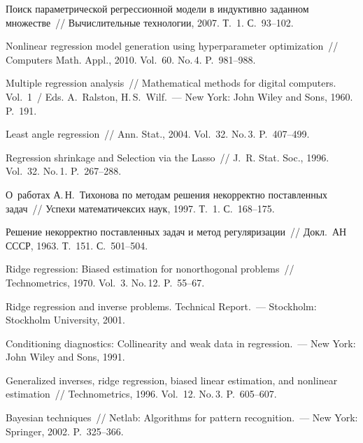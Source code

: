 \begin{multicols}{2}
{\small\frenchspacing
{%
\begin{thebibliography}{99}


 Поиск параметрической регрессионной модели в индуктивно заданном
множестве~// Вычислительные технологии, 2007. Т.~1. С.~93--102.

 Nonlinear regression model generation using 
hyperparameter optimization~// Computers Math. Appl., 2010. Vol.~60. No.\,4. P.~981--988.

 Multiple regression analysis~// 
Mathematical methods for digital computers. Vol.~1~/ Eds. A.~Ralston, H.\,S.~Wilf.~--- 
New York: John Wiley and Sons, 1960. P.~191.

Least angle regression~// Ann. Stat., 2004. Vol.~32. No.\,3. P.~407--499.

 Regression shrinkage and Selection via the Lasso~//
J.~R. Stat. Soc., 1996. Vol.~32. No.\,1.  P.~267--288.

 О~работах А.\,Н.~Тихонова по методам решения некорректно поставленных задач~//
Успехи математичексих наук, 1997. Т.~1. С.~168--175.

 Решение некорректно поставленных задач и метод регуляризации~//
Докл.\ АН СССР, 1963. Т.~151. С.~501--504.

 Ridge regression: Biased estimation for nonorthogonal problems~//
Technometrics, 1970. Vol.~3. No.\,12. P.~55--67.

 Ridge regression and inverse problems. Technical Report.~--- Stockholm: 
Stockholm University, 2001.

 Conditioning diagnostics: Collinearity and weak data in regression.~--- 
New York: John Wiley and Sons, 1991.

 Generalized inverses, ridge regression, biased linear estimation, 
and nonlinear estimation~// Technometrics, 1996. Vol.~12. No.\,3. P.~605--607.

 Bayesian techniques~// Netlab: Algorithms for pattern recognition.~--- 
New York: Springer, 2002. P.~325--366.


\end{thebibliography}}}
\end{multicols}
